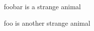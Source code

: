 \documentclass{article}
\begin{document}
\gls{foobar} is a strange animal

\gls{foo} is another strange animal
\printglossaries
\end{document}
